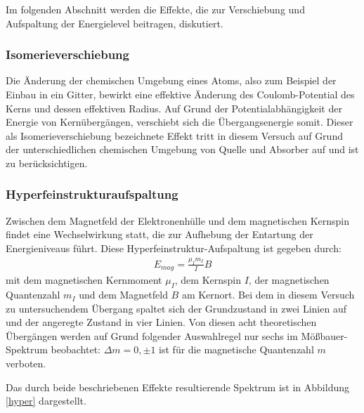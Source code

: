{{Im folgenden Abschnitt werden die Effekte, die zur Verschiebung und Aufspaltung der Energielevel beitragen, diskutiert.
\subsubsection{Isomerieverschiebung \label{Isomerie}}

Die Änderung der chemischen Umgebung eines Atoms, also zum Beispiel der Einbau in ein Gitter, bewirkt eine effektive Änderung des Coulomb-Potential des Kerns und dessen effektiven Radius. Auf Grund der Potentialabhängigkeit der Energie von Kernübergängen, verschiebt sich die Übergangsenergie somit. Dieser als Isomerieverschiebung bezeichnete Effekt tritt in diesem Versuch auf Grund der unterschiedlichen chemischen Umgebung von Quelle und Absorber auf und ist zu berücksichtigen.



\subsubsection{Hyperfeinstrukturaufspaltung}

Zwischen dem Magnetfeld der Elektronenhülle und dem magnetischen Kernspin findet eine Wechselwirkung statt, die zur Aufhebung der Entartung der Energieniveaus führt. Diese Hyperfeinstruktur-Aufspaltung 
ist gegeben durch:
\begin{align}
E_{mag} = \frac{\mu_I m_I}{I}B
\end{align}
mit dem magnetischen Kernmoment $\mu_I$, dem Kernspin $I$, der magnetischen Quantenzahl $m_I$ und dem Magnetfeld $B$ am Kernort.
Bei dem in diesem Versuch zu untersuchendem Übergang spaltet sich der Grundzustand in zwei Linien auf und der angeregte Zustand in vier Linien. Von diesen acht theoretischen Übergängen werden auf Grund folgender Auswahlregel nur sechs im Mößbauer-Spektrum beobachtet: $\Delta m =0, \pm 1$ ist für die magnetische Quantenzahl $m$ verboten.

Das durch beide beschriebenen Effekte resultierende Spektrum ist in Abbildung \ref{hyper} dargestellt.



}}
